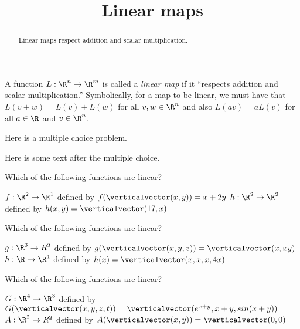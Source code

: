 \documentclass{ximera}
\title{Linear maps}
\begin{document}
\begin{abstract}
  Linear maps respect addition and scalar multiplication.
\end{abstract}

\begin{definition}
  A function $L: \R^n \to \R^m$ is called a \textit{linear map} if it
  ``respects addition and scalar multiplication.''  Symbolically, for
  a map to be linear, we must have that $L(v+w) = L(v)+L(w)$ for all
  $v,w \in \R^n$ and also $L(av) = a L(v)$ for all $a \in \R$ and
  $v\in \R^n$.
\end{definition}

\begin{exercise}
  Here is a multiple choice problem.

  \begin{solution}
    \begin{multiple-choice}
    \end{multiple-choice}
  \end{solution}

  Here is some text after the multiple choice.
\end{exercise}


\begin{question}
  Which of the following functions are linear?
  \begin{solution}
    \begin{multiple-choice}
    \choice[correct] $f: \R^2 \to \R^1$ defined by $f(\verticalvector(x,y)) = x+2y$
    \choice $h:\R^2 \to \R^2$ defined by $h(x,y) = \verticalvector(17,x)$
    \end{multiple-choice}
  \end{solution}
\end{question}

\begin{question}
  Which of the following functions are linear?
  \begin{solution}
    \begin{multiple-choice}
    \choice $g: \R^3 \to R^2$ defined by $g(\verticalvector(x,y,z)) = \verticalvector(x,xy)$
    \choice[correct] $h:\R \to \R^4$ defined by $h(x) = \verticalvector(x,x,x,4x)$
    \end{multiple-choice}
  \end{solution}
\end{question}

\begin{question}
  Which of the following functions are linear?
  \begin{solution}
    \begin{multiple-choice}
      \choice $G: \R^4 \to  \R^3$ defined by $G(\verticalvector(x,y,z,t)) = \verticalvector(e^{x+y},x+y,sin(x+y))$
      \choice $A: \R^2 \to R^2$ defined by $A(\verticalvector(x,y))=\verticalvector(0,0)$
    \end{multiple-choice}
  \end{solution}
\end{question}
	
\end{document}
